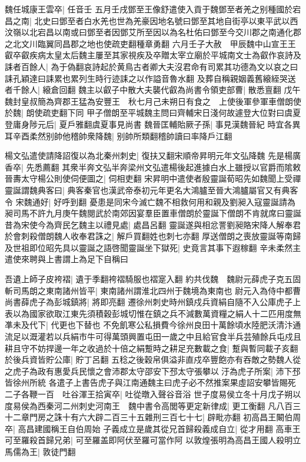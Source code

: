 魏任城康王雲卒|{
	任音壬}
五月壬戌鄧至王像舒遣使入貢于魏鄧至者羌之别種國於宕昌之南|{
	北史曰鄧至者白水羌也世為羌豪因地名號曰鄧至其地自街亭以東平武以西汶嶺以北宕昌以南或曰鄧至者因鄧艾所至因以為名杜佑曰鄧至今交川郡之南通化郡之北文川臨翼同昌郡之地也使疏吏翻種章勇翻}
六月壬子大赦　甲辰魏中山宣王王叡卒叡疾病太皇太后魏主屢至其家視疾及卒贈太宰立廟於平城南文士為叡作哀詩及誄者百餘人|{
	為于偽翻哀詩起於黄鳥古者卿大夫沒君命有司累其功德為文以哀之曰誄孔穎達曰誄累也累列生時行迹誄之以作謚音魯水翻}
及葬自稱親姻義舊縗絰哭送者千餘人|{
	縗倉回翻}
魏主以叡子中散大夫襲代叡為尚書令領吏部曹|{
	散悉亶翻}
戊午魏封皇叔簡為齊郡王猛為安豐王　秋七月己未朔日有食之　上使後軍參軍車僧朗使於魏|{
	朗使疏吏翻下同}
甲子僧朗至平城魏主問曰齊輔宋日淺何故遽登大位對曰虞夏登庸身陟元后|{
	夏戶雅翻虞夏事見尚書}
魏晉匡輔貽厥子孫|{
	事見漢魏晉紀}
時宜各異耳辛酉柔然别帥他稽帥衆降魏|{
	别帥所類翻稽帥讀曰率降戶江翻}


楊文弘遣使請降詔復以為北秦州刺史|{
	復扶又翻宋順帝昇明元年文弘降魏}
先是楊廣香卒|{
	先悉薦翻}
其衆半奔文弘半奔梁州文弘遣楊後起進據白水上雖授以官爵而隂敕晉夀太守楊公則使伺便圖之|{
	伺相吏翻}
宋昇明中遣使者殷靈誕荀昭先如魏聞上受禪靈誕謂魏典客曰|{
	典客秦官也漢武帝泰初元年更名大鴻臚至晉大鴻臚屬官又有典客令}
宋魏通好|{
	好呼到翻}
憂患是同宋今滅亡魏不相救何用和親及劉昶入寇靈誕請為昶司馬不許九月庚午魏閱武於南郊因宴羣臣置車僧朗於靈誕下僧朗不肯就席曰靈誕昔為宋使今為齊民乞魏主以禮見處|{
	處昌呂翻}
靈誕遂與相忿詈劉昶賂宋降人解奉君於會刺殺僧朗魏人收奉君誅之|{
	解戶買翻姓也刺七亦翻}
厚送僧朗之喪放靈誕等南歸及世祖即位昭先具以靈誕之語啓聞靈誕坐下獄死|{
	史竟言其事下遐稼翻}
辛未柔然主遣使來聘與上書謂上為足下自稱曰

吾遺上師子皮袴褶|{
	遺于季翻袴褶騎服也褶寔入翻}
約共伐魏　魏尉元薛虎子克五固斬司馬朗之東南諸州皆平|{
	東南諸州謂淮北四州于魏境為東南也}
尉元入為侍中都曹尚書薛虎子為彭城鎮將|{
	將即亮翻}
遷徐州刺史時州鎮戍兵資絹自隨不入公庫虎子上表以為國家欲取江東先須積穀彭城切惟在鎮之兵不減數萬資糧之絹人十二匹用度無凖未及代下|{
	代更也下替也}
不免飢寒公私損費今徐州良田十萬餘頃水陸肥沃清汴通流足以溉灌若以兵絹市牛可得萬頭興置屯田一歲之中且給官食半兵芸殖餘兵屯戍且耕且守不妨捍邊一年之收過於十倍之絹蹔時之耕足充數載之食|{
	蹔與暫同載子亥翻}
於後兵資皆貯公庫|{
	貯丁呂翻}
五稔之後穀帛俱溢非直戍卒豐飽亦有吞敵之勢魏人從之虎子為政有惠愛兵民懷之會沛郡太守邵安下邳太守張攀以汙為虎子所案|{
	沛下邳皆徐州所統}
各遣子上書告虎子與江南通魏主曰虎子必不然推案果虛詔安攀皆賜死二子各鞭一百　吐谷渾王拾寅卒|{
	吐從暾入聲谷音浴}
世子度易侯立冬十月戊子朔以度易侯為西秦河二州刺史河南王　魏中書令高閭等更定新律成|{
	更工衡翻}
凡八百三十二章門房之誅十有六大辟二百三十五雜刑三百七十七|{
	辟毗亦翻}
初高昌王闞伯周卒|{
	高昌建國稱王自伯周始}
子義成立是歲其從兄首歸殺義成自立|{
	從才用翻}
高車王可至羅殺首歸兄弟|{
	可至羅盖即阿伏至羅可當作阿}
以敦煌張明為高昌王國人殺明立馬儒為王|{
	敦徒門翻}


